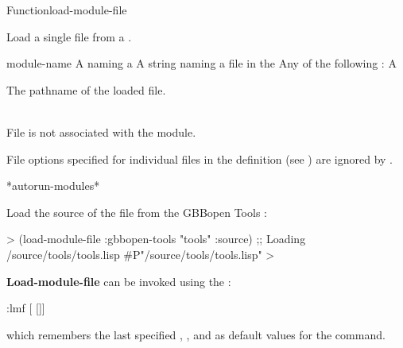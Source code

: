 \documentclass[10pt,twoside,english,pdftex]{article}
\begin{document}

\begin{functiondoc}{Function}{load-module-file}%
  {
    }
%
% 

\fnsyntax 

\fnpurpose Load a single file from a .

\fnpackage {}

\fnmodule {}

\fnargs
\begin{args}{module-name}
 A  naming a 
 A string naming a file in the 
\arg[option] Any of the following : 
\loadonefilemoduleoptions
\arg[pathname] A 
\end{args}

\fnreturns The pathname of the loaded file.

\fnerrors 
\modulenotdefined\\
%
File  is not associated with the module.

\relativedircircularity

\fndescription File options specified for individual files in the
 definition (see )
are ignored by .

\begin{alsos}{*autorun-modules*}
\end{alsos}

\fnexample Load the source of the file  from the GBBopen
Tools :
%
\W\supp
\begin{example}
  > (load-module-file :gbbopen-tools "tools" :source)
  ;; Loading /source/tools/tools.lisp
  #P"/source/tools/tools.lisp"
  >
\end{example}

\replnote \textbf{Load-module-file} can be invoked using the
:
%
%
%
\W\supp
\begin{example}
  :lmf \textrm{[}  \textrm{[}\superstar\textrm{]]}
\end{example}
%
which remembers the last specified ,
, and  as default values for the
command.

\end{functiondoc}
\end{document}
